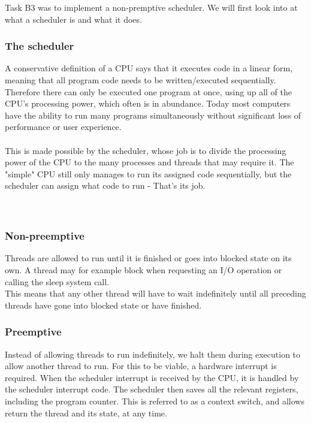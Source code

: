 Task B3 was to implement a non-premptive scheduler. We will first look into at what a scheduler is and what it does.

\subsubsection{The scheduler}
A conservative definition of a CPU says that it executes code in a linear form, meaning that all program code needs to be written/executed sequentially. Therefore there can only be executed one program at once, using up all of the CPU's processing power, which often is in abundance. Today most computers have the ability to run many programs simultaneously without significant loss of performance or user experience.\\
\\
This is made possible by the scheduler, whose job is to divide the processing power of the CPU to the many processes and threads that may require it. The "simple" CPU still only manages to run its assigned code sequentially, but the scheduler can assign what code to run - That's its job.
\\
\\
\\
\subsubsection{Non-preemptive}
Threads are allowed to run until it is finished or goes into blocked state on its own. A thread may for example block when requesting an I/O operation or calling the sleep system call.
\\
This means that any other thread will have to wait indefinitely until all preceding threads have gone into blocked state or have finished. 

\subsubsection{Preemptive}
Instead of allowing threads to run indefinitely, we halt them during execution to allow another thread to run. For this to be viable, a hardware interrupt is required. When the scheduler interrupt is received by the CPU, it is handled by the scheduler interrupt code. The scheduler then saves all the relevant registers, including the program counter. This is referred to as a context switch, and allows return the thread and its state, at any time.

